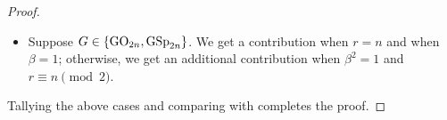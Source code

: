 \begin{proof}
\begin{itemize}
		\item Suppose $G\in\{\mathrm{GO}_{2n},\mathrm{GSp}_{2n}\}$. We get a contribution when $r=n$ and when $\beta=1$; otherwise, we get an additional contribution when $\beta^2=1$ and $r\equiv n\pmod2$.
	\end{itemize}
	Tallying the above cases and comparing with  completes the proof.
\end{proof}

